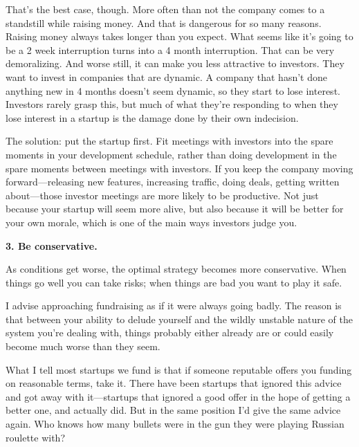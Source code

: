That's the best
                    case, though. More often than not the company comes to a
                    standstill while raising money. And that is dangerous for so
                    many reasons. Raising money always takes longer than you
                    expect. What seems like it's going to be a 2 week
                    interruption turns into a 4 month interruption. That can be
                    very demoralizing. And worse still, it can make you less
                    attractive to investors. They want to invest in companies
                    that are dynamic. A company that hasn't done anything new in
                    4 months doesn't seem dynamic, so they start to lose
                    interest. Investors rarely grasp this, but much of what
                    they're responding to when they lose interest in a startup
                    is the damage done by their own indecision.

The
                    solution: put the startup first. Fit meetings with investors
                    into the spare moments in your development schedule, rather
                    than doing development in the spare moments between meetings
                    with investors. If you keep the company moving
                    forward---releasing new features, increasing traffic,
                    doing deals, getting written about---those investor
                    meetings are more likely to be productive. Not just because
                    your startup will seem more alive, but also because it will
                    be better for your own morale, which is one of the main ways
                    investors judge you.


                    \textbf{3. Be conservative.}

As conditions get
                    worse, the optimal strategy becomes more conservative. When
                    things go well you can take risks; when things are bad you
                    want to play it safe.

I advise approaching
                    fundraising as if it were always going badly. The reason is
                    that between your ability to delude yourself and the wildly
                    unstable nature of the system you're dealing with, things
                    probably either already are or could easily become much
                    worse than they seem.

What I tell most startups
                    we fund is that if someone reputable offers you funding on
                    reasonable terms, take it. There have been startups that
                    ignored this advice and got away with it---startups that
                    ignored a good offer in the hope of getting a better one,
                    and actually did. But in the same position I'd give the same
                    advice again. Who knows how many bullets were in the gun
                    they were playing Russian roulette with?

